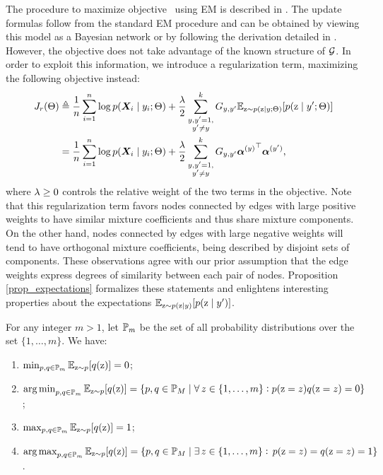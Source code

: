 The procedure to maximize objective~ using EM is described in . The update formulas follow from the standard EM procedure and can be obtained by viewing this model as a Bayesian network or by following the derivation detailed in . However, the objective  does not take advantage of the known structure of ${\mathcal{G}}$. In order to exploit this information, we introduce a regularization term, maximizing the following objective instead:
\begin{align}
    \label{eq:spamhmm_objective}
    J_r(\Theta) &\triangleq \frac{1}{n}\sum_{i=1}^n \log p({\bm{X}}_i \mid y_i; \Theta) + \frac{\lambda}{2} \sum_{\substack{y,y'=1,\\y'\neq y}}^{k} {G}_{y,y'} \mathbb{E}_{{\textnormal{z}} \sim p({\textnormal{z}} \mid y; \Theta)} [ p({\textnormal{z}} \mid y'; \Theta) ] \nonumber\\
    &= \frac{1}{n}\sum_{i=1}^n \log p({\bm{X}}_i \mid y_i; \Theta) + \frac{\lambda}{2} \sum_{\substack{y,y'=1,\\y'\neq y}}^{k} {G}_{y,y'} {{\bm{\alpha}}^{(y)}}^\top {\bm{\alpha}}^{(y')},
\end{align}
where $\lambda \geq 0$ controls the relative weight of the two terms in the objective. Note that this regularization term favors nodes connected by edges with large positive weights to have similar mixture coefficients and thus share mixture components. On the other hand, nodes connected by edges with large negative weights will tend to have orthogonal mixture coefficients, being described by disjoint sets of components. These observations agree with our prior assumption that the edge weights express degrees of similarity between each pair of nodes. Proposition \ref{prop_expectations} formalizes these statements and enlightens interesting properties about the expectations $\mathbb{E}_{{\textnormal{z}} \sim p({\textnormal{z}} \mid y)} [ p({\textnormal{z}} \mid y')]$.
\begin{proposition}
    \label{prop_expectations}
    For any integer $m>1$, let ${\mathbb{P}}_m$ be the set of all probability distributions over the set $\{1,\dots,m\}$. We have:
    \begin{enumerate}
        \item $\min_{p,q \in {\mathbb{P}}_m} \mathbb{E}_{{\textnormal{z}}\sim p} [ q({\textnormal{z}}) ] = 0$; \label{prop_min}
        \item $\operatorname*{arg\,min}_{p,q \in {\mathbb{P}}_m} \mathbb{E}_{{\textnormal{z}}\sim p} [ q({\textnormal{z}}) ] = \{p,q \in {\mathbb{P}}_M \mid \forall \, z \in \{1,\dots,m\}: p({\textnormal{z}} = z)q({\textnormal{z}} = z)=0\}$; \label{prop_argmin}
        \item $\max_{p,q \in {\mathbb{P}}_m} \mathbb{E}_{{\textnormal{z}}\sim p} [ q({\textnormal{z}}) ] = 1$; \label{prop_max}
        \item $\operatorname*{arg\,max}_{p,q \in {\mathbb{P}}_m} \mathbb{E}_{{\textnormal{z}}\sim p} [ q({\textnormal{z}}) ] = \{p,q \in {\mathbb{P}}_M \mid \exists \, z \in \{1,\dots,m\} : \, p({\textnormal{z}} = z)=q({\textnormal{z}} = z)=1\}$ \label{prop_argmax}.
    \end{enumerate}
\end{proposition}
